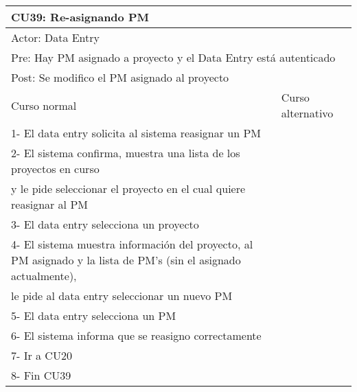 \begin{table}[H]
  \begin{adjustbox}{max width = \textwidth}
  \begin{tabular}{|l|l|}
    \hline
    \multicolumn{2}{|l|}{CU39: Re-asignando PM} \\\hline
    \multicolumn{2}{|l|}{Actor: Data Entry} \\\hline
    \multicolumn{2}{|l|}{Pre: Hay PM asignado a proyecto y el Data Entry está autenticado} \\\hline
    \multicolumn{2}{|l|}{Post: Se modifico el PM asignado al proyecto} \\\hline
     Curso normal & Curso alternativo\\ \hline
	 1- El data entry solicita al sistema reasignar un PM & \\ \hline
	 2- El sistema confirma, muestra una lista de los proyectos en curso \\ y le pide seleccionar el proyecto en el cual quiere reasignar al PM & \\ \hline
	 3- El data entry selecciona un proyecto & \\ \hline
     4- El sistema muestra información del proyecto, al PM asignado y la lista de PM's (sin el asignado actualmente), \\ le pide al data entry seleccionar un nuevo PM & \\ \hline
     5- El data entry selecciona un PM & \\ \hline
	 6- El sistema informa que se reasigno correctamente & \\ \hline
     7- Ir a CU20 & \\ \hline
     8- Fin CU39 & \\ \hline
  \end{tabular}
  \end{adjustbox}
\end{table}


